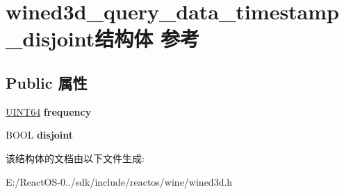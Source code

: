 \hypertarget{structwined3d__query__data__timestamp__disjoint}{}\section{wined3d\+\_\+query\+\_\+data\+\_\+timestamp\+\_\+disjoint结构体 参考}
\label{structwined3d__query__data__timestamp__disjoint}
\subsection*{Public 属性}
\begin{DoxyCompactItemize}
\item 
\mbox{\label{structwined3d__query__data__timestamp__disjoint_a7e773bcbb37a0093c70d49192599aaca}} 
\hyperlink{_processor_bind_8h_a57be03562867144161c1bfee95ca8f7c}{U\+I\+N\+T64} {\bfseries frequency}
\item 
\mbox{\label{structwined3d__query__data__timestamp__disjoint_aa985e26164a717d6b730a73e1c1828a8}} 
B\+O\+OL {\bfseries disjoint}
\end{DoxyCompactItemize}


该结构体的文档由以下文件生成\+:\begin{DoxyCompactItemize}
\item 
E\+:/\+React\+O\+S-\/0../sdk/include/reactos/wine/wined3d.\+h\end{DoxyCompactItemize}

